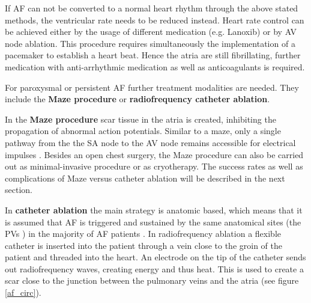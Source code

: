 If AF can not be converted to a normal heart rhythm through the above stated methods, the ventricular rate needs to be reduced instead. 
Heart rate control can be achieved either by the usage of different medication (e.g. Lanoxib) or by AV node ablation.  
This procedure requires simultaneously the implementation of a pacemaker to establish a heart beat. Hence the atria are still 
fibrillating, further medication with anti-arrhythmic medication as well as anticoagulants is required.\newline

For paroxysmal or persistent AF further treatment modalities are needed. They include the \textbf{Maze procedure} or \textbf{radiofrequency catheter ablation}.\newline

In the \textbf{Maze procedure} scar tissue in the atria is created, inhibiting the propagation of abnormal action potentials. Similar to a maze, 
only a single pathway from the the SA node to the AV node remains accessible for electrical impulses \cite{CTS13}. 
Besides an open chest surgery, the Maze procedure can also be carried out as minimal-invasive procedure or as cryotherapy. The success rates as well as 
complications of Maze versus catheter ablation will be described in the next section.\newline


In \textbf{catheter ablation} the main strategy is anatomic based, which means that it is assumed that AF is triggered and sustained by the 
same anatomical sites (the PVs \cite{Hai98}) in the majority of AF patients \cite{CE09}. In radiofrequency ablation a flexible catheter is 
inserted into the patient through a vein close to the groin of the patient and threaded into the heart. An electrode on the tip of the catheter 
sends out radiofrequency waves, creating energy and thus heat. This is used to create a 
scar close to the junction between the pulmonary veins and the atria (see figure \ref{af_circ}).\newline

